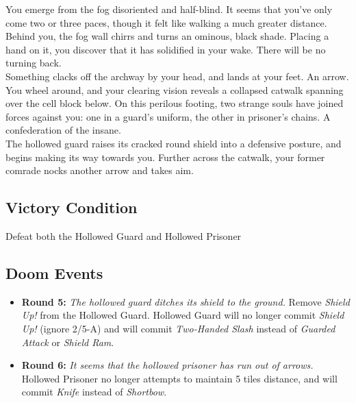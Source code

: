 You emerge from the fog disoriented and half-blind. It seems that you’ve only come two or three paces, though it felt like walking a much greater distance. Behind you, the fog wall chirrs and turns an ominous, black shade. Placing a hand on it, you discover that it has solidified in your wake. There will be no turning back.\\

Something clacks off the archway by your head, and lands at your feet. An arrow. You wheel around, and your clearing vision reveals a collapsed catwalk spanning over the cell block below. On this perilous footing, two strange souls have joined forces against you: one in a guard’s uniform, the other in prisoner’s chains. A confederation of the insane.\\

The hollowed guard raises its cracked round shield into a defensive posture, and begins making its way towards you. Further across the catwalk, your former comrade nocks another arrow and takes aim.

\subsection*{Victory Condition}
Defeat both the Hollowed Guard and Hollowed Prisoner

\subsection*{Doom Events}
\begin{itemize}
\item \textbf{Round 5:} \emph{The hollowed guard ditches its shield to the ground.} Remove \emph{Shield Up!} from the Hollowed Guard. Hollowed Guard will no longer commit \emph{Shield Up!} (ignore 2/5-A) and will commit \emph{Two-Handed Slash} instead of \emph{Guarded Attack} or \emph{Shield Ram}.
\item \textbf{Round 6:} \emph{It seems that the hollowed prisoner has run out of arrows.} Hollowed Prisoner no longer attempts to maintain 5 tiles distance, and will commit \emph{Knife} instead of \emph{Shortbow}.
\end{itemize}


